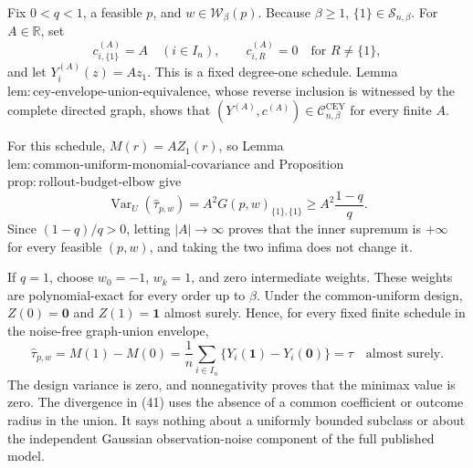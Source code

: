 Fix \(0<q<1\), a feasible \(p\), and \(w\in\mathcal W_\beta(p)\).  Because \(\beta\ge1\), \(\{1\}\in\mathcal S_{n,\beta}\).  For \(A\in\mathbb R\), set
\[
c^{(A)}_{i,\{1\}}=A\quad(i\in I_n),
\qquad
c^{(A)}_{i,R}=0
\quad\text{for }R\ne\{1\},
\]
and let \(Y_i^{(A)}(z)=Az_1\).  This is a fixed degree-one schedule.  Lemma~\(\mathrm{lem{:}cey\text{-}envelope\text{-}union\text{-}equivalence}\), whose reverse inclusion is witnessed by the complete directed graph, shows that \((Y^{(A)},c^{(A)})\in\mathcal C^{\mathrm{CEY}}_{n,\beta}\) for every finite \(A\).

For this schedule, \(M(r)=AZ_1(r)\), so Lemma~\(\mathrm{lem{:}common\text{-}uniform\text{-}monomial\text{-}covariance}\) and Proposition~\(\mathrm{prop{:}rollout\text{-}budget\text{-}elbow}\) give
\[
\operatorname{Var}_U(\widehat\tau_{p,w})
=A^2G(p,w)_{\{1\},\{1\}}
\ge A^2\frac{1-q}{q}.
\tag{41}
\]
Since \((1-q)/q>0\), letting \(|A|\to\infty\) proves that the inner supremum is \(+\infty\) for every feasible \((p,w)\), and taking the two infima does not change it.

If \(q=1\), choose \(w_0=-1\), \(w_k=1\), and zero intermediate weights.  These weights are polynomial-exact for every order up to \(\beta\).  Under the common-uniform design, \(Z(0)=\mathbf0\) and \(Z(1)=\mathbf1\) almost surely.  Hence, for every fixed finite schedule in the noise-free graph-union envelope,
\[
\widehat\tau_{p,w}=M(1)-M(0)
=\frac1n\sum_{i\in I_n}\{Y_i(\mathbf1)-Y_i(\mathbf0)\}
=\tau
\quad\text{almost surely}.
\]
The design variance is zero, and nonnegativity proves that the minimax value is zero.  The divergence in (41) uses the absence of a common coefficient or outcome radius in the union.  It says nothing about a uniformly bounded subclass or about the independent Gaussian observation-noise component of the full published model.